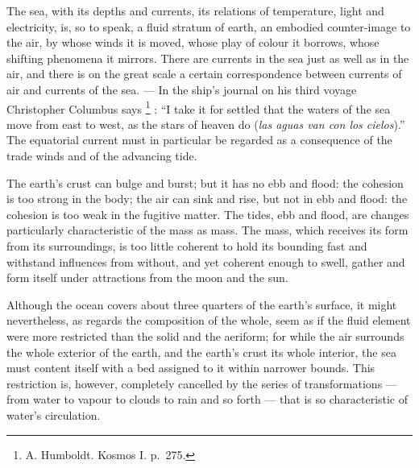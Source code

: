 \documentclass[12pt,a4paper]{book}
\begin{document}
The sea, with its depths and currents, its relations of temperature, light and electricity, is, so to speak, a fluid
stratum of earth, an embodied counter-image to the air, by whose winds it is moved, whose play of colour it borrows,
whose shifting phenomena it mirrors. There are currents in the sea just as well as in the air, and there is on the great
scale a certain correspondence between currents of air and currents of the sea. --- In the ship's journal
on his third voyage Christopher Columbus says%
\footnote{%
A. Humboldt. Kosmos I. p.\ 275.}%
: ``I take it for settled that the waters of the sea move from east to west, as the stars of heaven do
(\textit{las aguas van con los cielos}).'' The equatorial current must in particular be regarded as a consequence of the
trade winds and of the advancing tide.

The earth's crust can bulge and burst; but it has no ebb and flood: the cohesion is too strong in the body; the air can
sink and rise, but not in ebb and flood: the cohesion is too weak in the fugitive matter. The tides, ebb and flood, are
changes particularly characteristic of the mass as mass. The mass, which receives its form from its surroundings, is too
little coherent to hold its bounding fast and withstand influences from without, and yet coherent enough to swell, gather
and form itself under attractions from the moon and the sun.

Although the ocean covers about three quarters of the earth's surface, it might nevertheless, as regards the composition
of the whole, seem as if the fluid element were more restricted than the solid and the aeriform; for while the air
surrounds the whole exterior of the earth, and the earth's crust its whole interior, the sea must content itself with a
bed assigned to it within narrower bounds. This restriction is, however, completely cancelled by the series of
transformations --- from water to vapour to clouds to rain and so forth --- that is so characteristic of water's
circulation.
\end{document}
